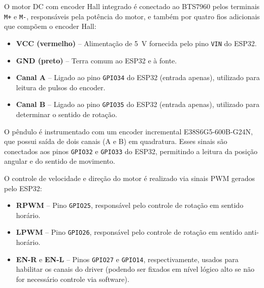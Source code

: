\documentclass[9pt,a4paper,twocolumn,twoside]{tau-class/tau}
\begin{document}
    O motor DC com encoder Hall integrado é conectado ao BTS7960 pelos terminais \texttt{M+} e \texttt{M-}, responsáveis pela potência do motor, e também por quatro fios adicionais que compõem o encoder Hall:
    \begin{itemize}
        \item \textbf{VCC (vermelho)} – Alimentação de \SI{5}{\volt} fornecida pelo pino \texttt{VIN} do ESP32.
        \item \textbf{GND (preto)} – Terra comum ao ESP32 e à fonte.
        \item \textbf{Canal A} – Ligado ao pino \texttt{GPIO34} do ESP32 (entrada apenas), utilizado para leitura de pulsos do encoder.
        \item \textbf{Canal B} – Ligado ao pino \texttt{GPIO35} do ESP32 (entrada apenas), utilizado para determinar o sentido de rotação.
    \end{itemize}

    O pêndulo é instrumentado com um encoder incremental E38S6G5-600B-G24N, que possui saída de dois canais (A e B) em quadratura. Esses sinais são conectados aos pinos \texttt{GPIO32} e \texttt{GPIO33} do ESP32, permitindo a leitura da posição angular e do sentido de movimento.

    O controle de velocidade e direção do motor é realizado via sinais PWM gerados pelo ESP32:
    \begin{itemize}
        \item \textbf{RPWM} – Pino \texttt{GPIO25}, responsável pelo controle de rotação em sentido horário.
        \item \textbf{LPWM} – Pino \texttt{GPIO26}, responsável pelo controle de rotação em sentido anti-horário.
        \item \textbf{EN-R} e \textbf{EN-L} – Pinos \texttt{GPIO27} e \texttt{GPIO14}, respectivamente, usados para habilitar os canais do driver (podendo ser fixados em nível lógico alto se não for necessário controle via software).
    \end{itemize}
\end{document}
